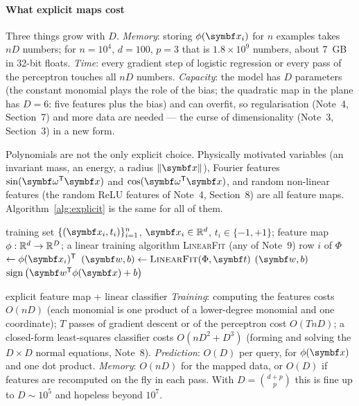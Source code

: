 \documentclass[11pt]{article}
\newcommand{\w}{\vect{w}}
\begin{document}
\paragraph{What explicit maps cost} Three things grow with $D$. \emph{Memory}: storing $\phi(\x_i)$ for $n$ examples
takes $nD$ numbers; for $n = 10^4$, $d = 100$, $p = 3$ that is $1.8 \times 10^9$ numbers, about 7~GB in 32-bit floats.
\emph{Time}: every gradient step of logistic regression or every pass of the perceptron touches all $nD$ numbers.
\emph{Capacity}: the model has $D$ parameters (the constant monomial plays the role of the bias; the quadratic map in
the plane has $D = 6$: five features plus the bias) and can overfit, so regularisation (Note~4, Section~7) and more data
are needed --- the curse of dimensionality (Note~3, Section~3) in a new form.

Polynomials are not the only explicit choice. Physically motivated variables (an invariant mass, an energy, a radius
$\norm{\x}$), Fourier features $\sin(\vect{\omega}\T\x)$ and $\cos(\vect{\omega}\T\x)$, and random non-linear features
(the random ReLU features of Note~4, Section~8) are all feature maps. Algorithm~\ref{alg:explicit} is the same for all
of them.

\begin{algorithm}[htbp]
\caption{Explicit feature map followed by a linear classifier}\label{alg:explicit}
\begin{algorithmic}[1]
\Require training set $\{(\x_i, t_i)\}_{i=1}^n$, $\x_i \in \R^d$, $t_i \in \{-1,+1\}$; feature map $\phi : \mathbb{R}^d \to \mathbb{R}^D$;
  a linear training algorithm \textsc{LinearFit} (any of Note~9)
    \State row $i$ of $\Phi$ $\gets \phi(\x_i)\T$ 
  \EndFor
  \State $(\w, b) \gets \textsc{LinearFit}(\Phi, \vect{t})$ 
  \State \Return $(\w, b)$
\EndFunction
\Function{ExplicitPredict}{$\x$; $\w, b$}
  \State \Return $\operatorname{sign}\big(\w\T\phi(\x) + b\big)$
\EndFunction
\end{algorithmic}
\end{algorithm}

\begin{runtime}{explicit feature map + linear classifier}
\emph{Training}: computing the features costs $O(nD)$ (each monomial is one product of a lower-degree monomial and one
coordinate); $T$ passes of gradient descent or of the perceptron cost $O(TnD)$; a closed-form least-squares classifier costs
$O(nD^2 + D^3)$ (forming and solving the $D \times D$ normal equations, Note~8). \emph{Prediction}: $O(D)$ per query,
for $\phi(\x)$ and one dot product. \emph{Memory}: $O(nD)$ for the mapped data, or $O(D)$ if features are recomputed
on the fly in each pass. With $D = \binom{d+p}{p}$ this is fine up to $D \sim 10^5$ and hopeless beyond $10^7$.
\end{runtime}
\end{document}
